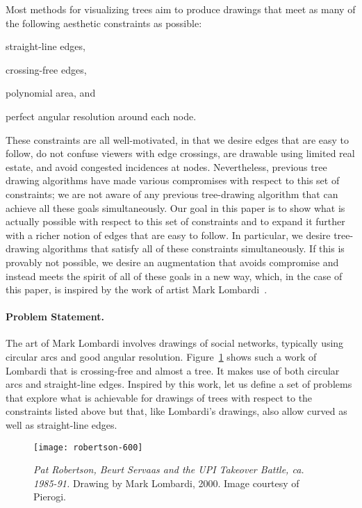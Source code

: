 \documentclass[11pt]{article}
\begin{document}
Most methods for visualizing trees aim to produce drawings
that meet as many of the following aesthetic constraints as possible:
\begin{list}{}{
\setlength{\leftmargin}{5em}
\setlength{\labelwidth}{3em}
\setlength{\itemindent}{0em}}
\item straight-line edges,
\item crossing-free edges,
\item polynomial area, and
\item perfect angular resolution around each node.
\end{list}
These constraints are all well-motivated, in that we 
desire edges that are easy to follow, do not confuse viewers with
edge crossings,
are drawable using limited real estate, and avoid congested 
incidences at nodes.
Nevertheless, previous tree drawing algorithms have made various compromises
with respect to this set of constraints; we are not aware of any previous tree-drawing algorithm
that can achieve all these goals simultaneously.
Our goal in this paper is to show what is actually possible with respect to
this set of constraints and to expand it 
further with a richer notion of edges that are easy to follow.
In particular, we desire tree-drawing algorithms that satisfy
all of these constraints simultaneously.
If this is provably not possible,
we desire an augmentation that avoids compromise and instead 
meets the spirit of all of these goals in a new way, which, in the
case of this paper, is
inspired by the work of artist Mark Lombardi~\cite{hl-mlgn-03}.


\paragraph{Problem Statement.}
The art of Mark Lombardi involves drawings of social networks,
typically using circular arcs and good angular resolution.
Figure~\ref{fig:lombardi} shows such a work of Lombardi that is
crossing-free and almost a tree.
It makes use of both circular arcs and straight-line
edges.
Inspired by this work, let us define a set of problems that explore
what is achievable for drawings of trees with respect to the
constraints listed above but that, like Lombardi's drawings, also allow curved as well as straight-line edges.

\begin{figure}[hbt!]
\centering
\texttt{[image: robertson-600]}
\caption{\label{fig:lombardi} \textit{Pat Robertson,
Beurt Servaas and the UPI Takeover Battle, ca. 1985-91.} Drawing by Mark Lombardi, 2000. Image courtesy of Pierogi.}
\end{figure}
\end{document}
